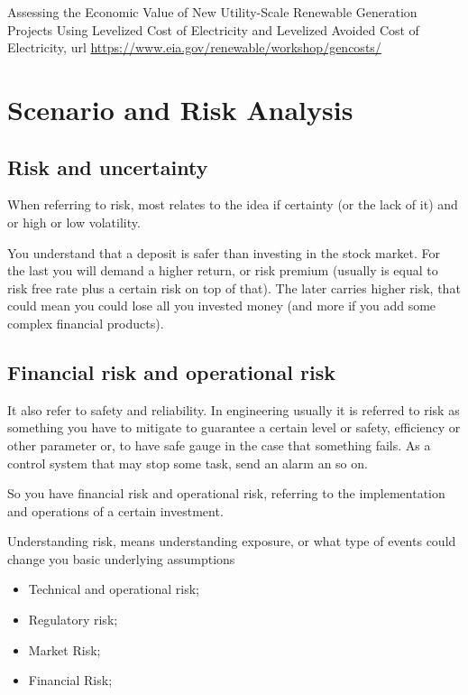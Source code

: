 \documentclass[]{book}
\providecommand{\tightlist}{%
  \setlength{\itemsep}{0pt}\setlength{\parskip}{0pt}}
\theoremstyle{definition}
\theoremstyle{definition}
\theoremstyle{definition}
\theoremstyle{remark}
\begin{document}
Assessing the Economic Value of New Utility-Scale Renewable Generation
Projects Using Levelized Cost of Electricity and Levelized Avoided Cost
of Electricity, url
\url{https://www.eia.gov/renewable/workshop/gencosts/}

\section{Scenario and Risk Analysis}\label{scenario-and-risk-analysis}

\subsection{Risk and uncertainty}\label{risk-and-uncertainty}

When referring to risk, most relates to the idea if certainty (or the
lack of it) and or high or low volatility.

You understand that a deposit is safer than investing in the stock
market. For the last you will demand a higher return, or risk premium
(usually is equal to risk free rate plus a certain risk on top of that).
The later carries higher risk, that could mean you could lose all you
invested money (and more if you add some complex financial products).

\subsection{Financial risk and operational
risk}\label{financial-risk-and-operational-risk}

It also refer to safety and reliability. In engineering usually it is
referred to risk as something you have to mitigate to guarantee a
certain level or safety, efficiency or other parameter or, to have safe
gauge in the case that something fails. As a control system that may
stop some task, send an alarm an so on.

So you have financial risk and operational risk, referring to the
implementation and operations of a certain investment.

Understanding risk, means understanding exposure, or what type of events
could change you basic underlying assumptions

\begin{itemize}
\tightlist
\item
  Technical and operational risk;
\item
  Regulatory risk;
\item
  Market Risk;
\item
  Financial Risk;
\end{itemize}
\end{document}
